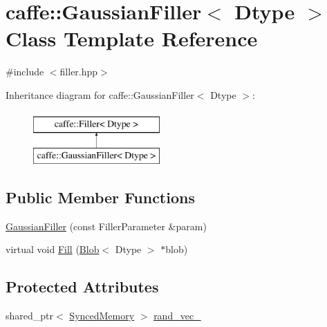 \hypertarget{classcaffe_1_1_gaussian_filler}{\section{caffe\+:\+:Gaussian\+Filler$<$ Dtype $>$ Class Template Reference}
\label{classcaffe_1_1_gaussian_filler}
}


{\ttfamily \#include $<$filler.\+hpp$>$}

Inheritance diagram for caffe\+:\+:Gaussian\+Filler$<$ Dtype $>$\+:\begin{figure}[H]
\begin{center}
\leavevmode
\includegraphics[height=2.000000cm]{classcaffe_1_1_gaussian_filler}
\end{center}
\end{figure}
\subsection*{Public Member Functions}
\begin{DoxyCompactItemize}
\item 
\hyperlink{classcaffe_1_1_gaussian_filler_a37a676739d64cf07b61767c99dd821b2}{Gaussian\+Filler} (const Filler\+Parameter \&param)
\item 
virtual void \hyperlink{classcaffe_1_1_gaussian_filler_ac45d5d0695521d7d71a4d5bccb659f21}{Fill} (\hyperlink{classcaffe_1_1_blob}{Blob}$<$ Dtype $>$ $\ast$blob)
\end{DoxyCompactItemize}
\subsection*{Protected Attributes}
\begin{DoxyCompactItemize}
\item 
shared\+\_\+ptr$<$ \hyperlink{classcaffe_1_1_synced_memory}{Synced\+Memory} $>$ \hyperlink{classcaffe_1_1_gaussian_filler_afec462a3671a2ad0cc09b6149be0b63c}{rand\+\_\+vec\+\_\+}
\end{DoxyCompactItemize}


